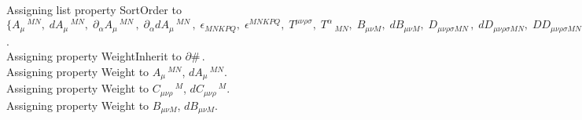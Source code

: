 \documentclass[11pt]{article}
\begin{document}
Assigning list property SortOrder to $\{{A}_{\mu}\,^{M N},\; {dA}_{\mu}\,^{M N},\; {\partial}_{\alpha}{{A}_{\mu}\,^{M N}}\, ,\; {\partial}_{\alpha}{{dA}_{\mu}\,^{M N}}\, ,\; {\epsilon}_{M N K P Q},\; {\epsilon}^{M N K P Q},\; {T}^{\mu \nu \rho \sigma},\; {T}^{\alpha}\,_{M N},\; {B}_{\mu \nu M},\; {dB}_{\mu \nu M},\; {D}_{\mu \nu \rho \sigma M N}\, ,\; {dD}_{\mu \nu \rho \sigma M N},\; {DD}_{\mu \nu \rho \sigma M N},\; {F}_{\mu \nu \rho M},\; {F}_{\mu \nu \rho \sigma}\,^{M},\; {\partial}_{\mu}{{A}_{\mu}\,^{M N}}\, ,\; {\partial}_{\alpha}{{F}_{\mu \nu}\,^{M N}}\, ,\; {\partial}_{\alpha}{{B}_{\mu \nu M}}\, ,\; {\partial}_{\alpha}{{dB}_{\mu \nu M}}\, ,\; {\partial}_{\alpha}{{F}_{\mu \nu \rho M}}\, ,\; {\partial}_{\alpha}{{C}_{\mu \nu \rho}\,^{M}}\, ,\; {\partial}_{\alpha}{{dC}_{\mu \nu \rho}\,^{M}}\, ,\; {\partial}_{\alpha}{{F}_{\mu \nu \rho \sigma}\,^{M}}\, ,\; {\partial}_{\alpha}{{G}_{\mu \nu \rho \sigma M N}}\, ,\; {\partial}_{\alpha}{{dG}_{\mu \nu \rho \sigma M N}}\, ,\; {\delta}^{M1}\,_{M},\; {\delta}_{M1}\,^{M},\; a1,\; a2,\; a3,\; a4,\; a5,\; a6,\; a7,\; a8,\; a9,\; a10,\; a11,\; a12,\; b1,\; b2,\; b3,\; b4,\; b5,\; b6,\; b7,\; b8,\; b9,\; b10,\; b11,\; b12,\; c1,\; c2,\; c3,\; c4,\; c5,\; c6,\; c7,\; d1,\; d2,\; d3,\; d4,\; d5,\; d6,\; d7\}$.
\\
Assigning property WeightInherit to $\partial{\#}\, $.
\\
Assigning property Weight to ${A}_{\mu}\,^{M N}$, ${dA}_{\mu}\,^{M N}$.
\\
Assigning property Weight to ${C}_{\mu \nu \rho}\,^{M}$, ${dC}_{\mu \nu \rho}\,^{M}$.
\\
Assigning property Weight to ${B}_{\mu \nu M}$, ${dB}_{\mu \nu M}$.
\\
\end{document}
